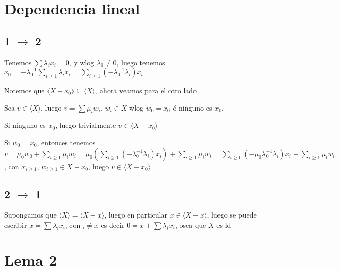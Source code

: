 \documentclass{article}
\begin{document}
\section{Dependencia lineal}
\subsection{1 $\to$ 2}
Tenemos $\sum \lambda_ix_i = 0$, y wlog $\lambda_0 \neq 0$, luego tenemos
$x_0 = -\lambda_0^{-1}\sum_{i \geq 1} \lambda_ix_i
= \sum_{i \geq 1} (-\lambda_0^{-1}\lambda_i)x_i$

Notemos que $\langle X - x_0 \rangle\subseteq \langle X \rangle$, ahora veamos para
el otro lado

Sea $v \in \langle X \rangle$, luego $v = \sum \mu_iw_i$, $w_i \in X$ wlog $w_0 = x_0$ ó
ninguno es $x_0$.

Si ninguno es $x_0$, luego trivialmente $v \in \langle X - x_0 \rangle$

Si $w_0 = x_0$, entonces tenemos $v = \mu_0w_0  + \sum_{i \geq 1} \mu_iw_i
= 
\mu_0\left(\sum_{i \geq 1} (-\lambda_0^{-1}\lambda_i)x_i\right)
+ \sum_{i \geq 1} \mu_iw_i
=
\sum_{i \geq 1} (-\mu_0\lambda_0^{-1}\lambda_i)x_i
+ \sum_{i \geq 1} \mu_iw_i
$, con $x_{i \geq 1}$, $w_{i \geq 1} \in X - x_0$, luego $v \in \langle X - x_0 \rangle$

\subsection{2 $\to$ 1}
Supongamos que $\langle X \rangle = \langle X - x \rangle$, luego en particular
$x \in \langle X - x \rangle$, luego se puede escribir $x = \sum \lambda_ix_i$, 
con $_i \neq x$ es decir $0 = x + \sum\lambda_ix_i$, osea que $X$ es ld

\section{Lema 2}
\end{document}
